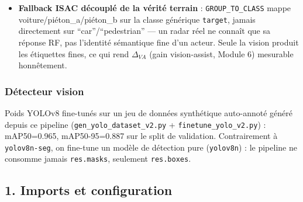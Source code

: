 \documentclass[11pt]{article}
\begin{document}
\begin{itemize}
  comme tel, quel que soit son alignement à l'écran avec une détection
  vision. Ce garde-fou maintient le raffinement vision physiquement
  cohérent malgré la simplification du modèle caméra sténopé (sans
  gestion explicite de la profondeur/occlusion).
\item
  \textbf{Fallback ISAC découplé de la vérité terrain} :
  \texttt{GROUP\_TO\_CLASS} mappe voiture/piéton\_a/piéton\_b sur la
  classe générique \texttt{target}, jamais directement sur
  ``car''/``pedestrian'' --- un radar réel ne connaît que sa réponse RF,
  pas l'identité sémantique fine d'un acteur. Seule la vision produit
  les étiquettes fines, ce qui rend \(\Delta_{VA}\) (gain vision-assist,
  Module 6) mesurable honnêtement.
\end{itemize}

\subsubsection{Détecteur vision}\label{duxe9tecteur-vision}

Poids YOLOv8 fine-tunés sur un jeu de données synthétique auto-annoté
généré depuis ce pipeline (\texttt{gen\_yolo\_dataset\_v2.py} +
\texttt{finetune\_yolo\_v2.py}) : mAP50=0.965, mAP50-95=0.887 sur le
split de validation. Contrairement à \texttt{yolov8n-seg}, on fine-tune
un modèle de détection pure (\texttt{yolov8n}) : le pipeline ne consomme
jamais \texttt{res.masks}, seulement \texttt{res.boxes}.

    \subsection{1. Imports et configuration}\label{imports-et-configuration}
\end{document}
